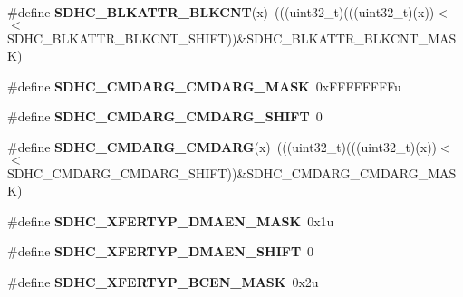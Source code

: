 \begin{DoxyCompactItemize}
\item 
\#define {\bfseries S\+D\+H\+C\+\_\+\+B\+L\+K\+A\+T\+T\+R\+\_\+\+B\+L\+K\+C\+NT}(x)~(((uint32\+\_\+t)(((uint32\+\_\+t)(x))$<$$<$S\+D\+H\+C\+\_\+\+B\+L\+K\+A\+T\+T\+R\+\_\+\+B\+L\+K\+C\+N\+T\+\_\+\+S\+H\+I\+FT))\&S\+D\+H\+C\+\_\+\+B\+L\+K\+A\+T\+T\+R\+\_\+\+B\+L\+K\+C\+N\+T\+\_\+\+M\+A\+SK)\hypertarget{group__SDHC__Register__Masks_ga02677301c96c876e9db0d959ce6d5585}{}\label{group__SDHC__Register__Masks_ga02677301c96c876e9db0d959ce6d5585}

\item 
\#define {\bfseries S\+D\+H\+C\+\_\+\+C\+M\+D\+A\+R\+G\+\_\+\+C\+M\+D\+A\+R\+G\+\_\+\+M\+A\+SK}~0x\+F\+F\+F\+F\+F\+F\+F\+Fu\hypertarget{group__SDHC__Register__Masks_ga96ab88ba50cc09465c266e3aab2ba3b0}{}\label{group__SDHC__Register__Masks_ga96ab88ba50cc09465c266e3aab2ba3b0}

\item 
\#define {\bfseries S\+D\+H\+C\+\_\+\+C\+M\+D\+A\+R\+G\+\_\+\+C\+M\+D\+A\+R\+G\+\_\+\+S\+H\+I\+FT}~0\hypertarget{group__SDHC__Register__Masks_gaa96f4afe969ac51d89ac52df46867f0a}{}\label{group__SDHC__Register__Masks_gaa96f4afe969ac51d89ac52df46867f0a}

\item 
\#define {\bfseries S\+D\+H\+C\+\_\+\+C\+M\+D\+A\+R\+G\+\_\+\+C\+M\+D\+A\+RG}(x)~(((uint32\+\_\+t)(((uint32\+\_\+t)(x))$<$$<$S\+D\+H\+C\+\_\+\+C\+M\+D\+A\+R\+G\+\_\+\+C\+M\+D\+A\+R\+G\+\_\+\+S\+H\+I\+FT))\&S\+D\+H\+C\+\_\+\+C\+M\+D\+A\+R\+G\+\_\+\+C\+M\+D\+A\+R\+G\+\_\+\+M\+A\+SK)\hypertarget{group__SDHC__Register__Masks_ga396ddd22ee6d52bc20fe7838e2832cff}{}\label{group__SDHC__Register__Masks_ga396ddd22ee6d52bc20fe7838e2832cff}

\item 
\#define {\bfseries S\+D\+H\+C\+\_\+\+X\+F\+E\+R\+T\+Y\+P\+\_\+\+D\+M\+A\+E\+N\+\_\+\+M\+A\+SK}~0x1u\hypertarget{group__SDHC__Register__Masks_ga4d3f71daacb879dbeb42972d25faa220}{}\label{group__SDHC__Register__Masks_ga4d3f71daacb879dbeb42972d25faa220}

\item 
\#define {\bfseries S\+D\+H\+C\+\_\+\+X\+F\+E\+R\+T\+Y\+P\+\_\+\+D\+M\+A\+E\+N\+\_\+\+S\+H\+I\+FT}~0\hypertarget{group__SDHC__Register__Masks_ga5cecfd8f158b456d3a2a9ea7820117b2}{}\label{group__SDHC__Register__Masks_ga5cecfd8f158b456d3a2a9ea7820117b2}

\item 
\#define {\bfseries S\+D\+H\+C\+\_\+\+X\+F\+E\+R\+T\+Y\+P\+\_\+\+B\+C\+E\+N\+\_\+\+M\+A\+SK}~0x2u\hypertarget{group__SDHC__Register__Masks_ga1d7dcef14285859fb5f204d71d2083cc}{}\label{group__SDHC__Register__Masks_ga1d7dcef14285859fb5f204d71d2083cc}


\end{DoxyCompactItemize}
